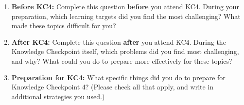 \documentclass[10pt]{article}
\begin{document}
\begin{enumerate}

\item \textbf{Before KC4:}
Complete this question \textbf{before} you attend KC4. During your preparation, which learning targets did you find the most challenging? What made these topics difficult for you?

\vfill

\item \textbf{After KC4:}
Complete this question \textbf{after} you attend KC4. During the Knowledge Checkpoint itself, which problems did you find most challenging, and why? What could you do to prepare more effectively for these topics?

\vfill

\newpage

\item \textbf{Preparation for KC4:}
What specific things did you do to prepare for Knowledge Checkpoint 4? (Please check all that apply, and write in additional strategies you used.)


\end{enumerate}
\end{document}
